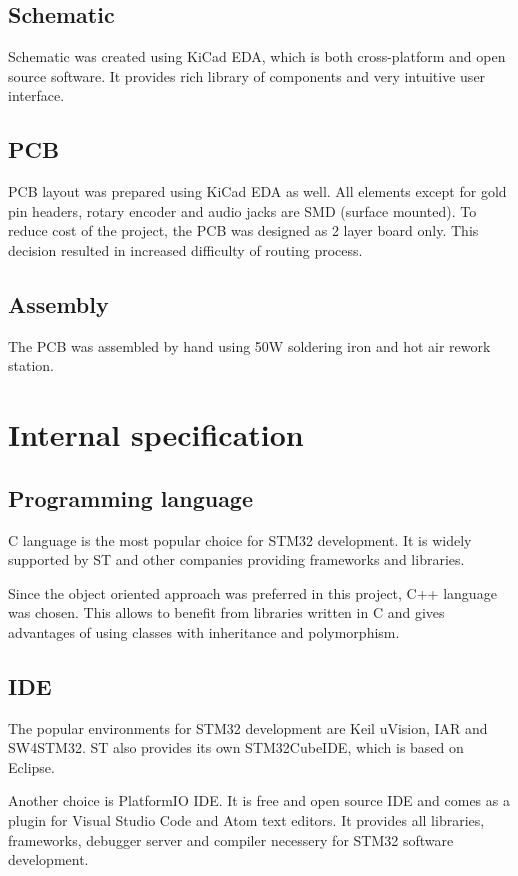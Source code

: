 \documentclass[a4paper,twoside,12pt]{book}
\begin{document}
\section{Schematic}
Schematic was created using KiCad EDA,
which is both cross-platform and open source software.
It provides rich library of components and very intuitive user interface.

\section{PCB}
PCB layout was prepared using KiCad EDA as well.
All elements except for gold pin headers,
rotary encoder and audio jacks are SMD (surface mounted).
To reduce cost of the project, the PCB was designed as 2 layer board only.
This decision resulted in increased difficulty of routing process.

\section{Assembly}
The PCB was assembled by hand using 50W soldering iron and hot air rework station.
\newpage



\chapter{Internal specification}

\section{Programming language}
C language is the most popular choice for STM32 development.
It is widely supported by ST and other companies providing frameworks and libraries. 

Since the object oriented approach was preferred in this project,
C++ language was chosen.
This allows to benefit from libraries written in C
and gives advantages of using classes with inheritance and polymorphism.

\section{IDE}
The popular environments for STM32 development are Keil uVision, IAR and SW4STM32.
ST also provides its own STM32CubeIDE, which is based on Eclipse.

Another choice is PlatformIO IDE.
It is free and open source IDE and
comes as a plugin for Visual Studio Code and Atom text editors.
It provides all libraries, frameworks,
debugger server and compiler necessery for STM32 software development.
\end{document}
